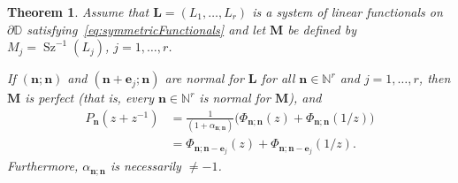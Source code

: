 \documentclass[reqno,centertags,11pt,draft]{amsart}
\newtheorem{thm}{Theorem}[section]
\newtheorem{rem}[thm]{Remark}
\newcommand{\N}{\mathbb{N}}
\newcommand{\T}{\mathbb{\partial\mathbb{D}}}
\newcommand{\abs}[1]{\left|#1\right|}
\begin{document}
\begin{thm}\label{thm:szego mapping type II}
    Assume that $\bm{L} = (L_1,\dots,L_r)$ is a system of linear functionals on $\T$ satisfying~\eqref{eq:symmetricFunctionals} and let $\bm{M}$ be defined by $M_j=\operatorname{Sz}^{-1}(L_j)$, $j = 1,\dots,r$.

    If $(\bm{n};\bm{n})$ and $(\bm{n}+\bm{e}_j;\bm{n})$ are normal for $\bm{L}$ for all $\bm{n}\in\N^r$ and $j=1,\ldots,r$, then $\bm{M}$ is perfect (that is, every $\bm{n}\in\N^r$ is normal for $\bm{M}$), and
    \begin{align}\label{eq:SzegoPolynomialRelation}
          P_{\bm{n}}(z+z^{-1}) & = \frac{1}{(1+\alpha_{\bm{n};\bm{n}})} \Big( \Phi_{\bm{n};\bm{n}}(z) + \Phi_{\bm{n};\bm{n}}(1/z) \Big) 
          \\
          \label{eq:SzegoPolynomialRelation2}
          & = \Phi_{\bm{n};\bm{n}-\bm{e}_j}(z) + \Phi_{\bm{n};\bm{n}-\bm{e}_j}(1/z).
        \end{align}
        Furthermore, $\alpha_{\bm{n};\bm{n}}$ is necessarily $\ne -1$. 
\end{thm}
\end{document}
